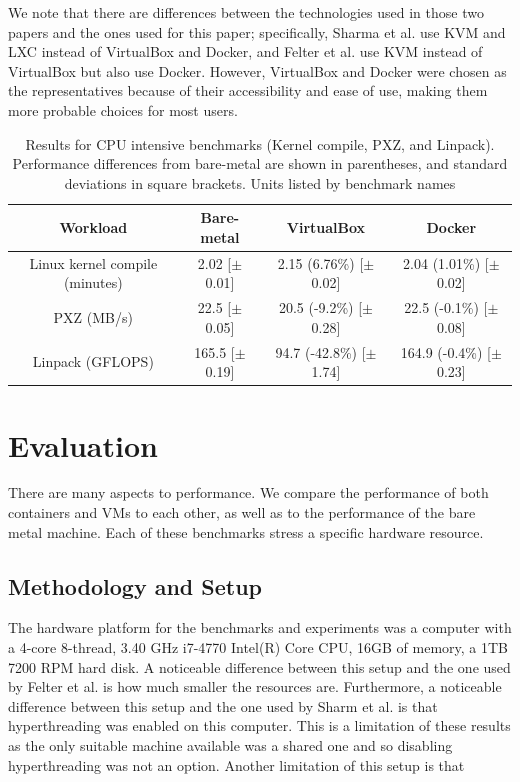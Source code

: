 \documentclass{sig-alternate-10pt}
\begin{document}
We note that there are differences between the technologies used in those two papers and the ones used for this paper; specifically, Sharma et al. use KVM and LXC\cite{sharma:2016} instead of VirtualBox and Docker, and Felter et al. use KVM instead of VirtualBox but also use Docker\cite{felter:2014}. However, VirtualBox and Docker were chosen as the representatives because of their accessibility and ease of use, making them more probable choices for most users.


\begin{table}
\centering
\begin{tabular}{|c|c|c|c|} \hline
Workload & Bare-metal & VirtualBox & Docker \\ \hline
Linux kernel compile (minutes) & 2.02 [$\pm$0.01] & 2.15 (6.76\%) [$\pm$0.02] & 2.04 (1.01\%) [$\pm$0.02] \\ \hline
PXZ (MB/s) & 22.5 [$\pm$0.05] & 20.5 (-9.2\%) [$\pm$0.28] & 22.5 (-0.1\%) [$\pm$0.08] \\ \hline
Linpack (GFLOPS) & 165.5 [$\pm$0.19] & 94.7 (-42.8\%) [$\pm$1.74] & 164.9 (-0.4\%) [$\pm$0.23] \\ \hline

\hline\end{tabular}
\captionsetup{justification=centering}
\caption{Results for CPU intensive benchmarks (Kernel compile, PXZ, and Linpack). Performance differences from bare-metal are shown in parentheses, and standard deviations in square brackets. Units listed by benchmark names}
\end{table}

\section{Evaluation}
There are many aspects to performance. We compare the performance of both containers and VMs to each other, as well as to the performance of the bare metal machine. Each of these benchmarks stress a specific hardware resource. 

\subsection{Methodology and Setup}
The hardware platform for the benchmarks and experiments was a computer with a 4-core 8-thread, 3.40 GHz i7-4770 Intel(R) Core CPU, 16GB of memory, a 1TB 7200 RPM hard disk. A noticeable difference between this setup and the one used by Felter et al. is how much smaller the resources are. Furthermore, a noticeable difference between this setup and the one used by Sharm et al. is that hyperthreading was enabled on this computer. This is a limitation of these results as the only suitable machine available was a shared one and so disabling hyperthreading was not an option. Another limitation of this setup is that 
\end{document}
